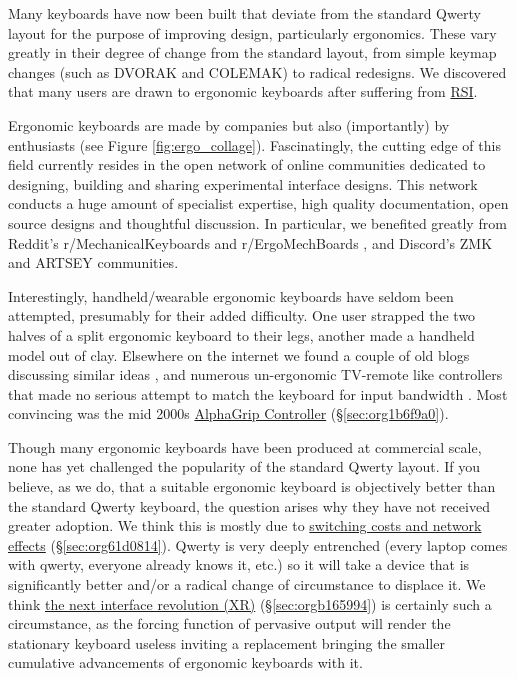 \documentclass[logo,bsc,singlespacing,parskip]{infthesis}
\begin{document}
Many keyboards have now been built that deviate from the standard Qwerty layout for the purpose of improving design, particularly ergonomics.
These vary greatly in their degree of change from the standard layout, from simple keymap changes (such as DVORAK and COLEMAK) to radical redesigns.
We discovered that many users are drawn to ergonomic keyboards after suffering from \hyperref[org77f0234]{RSI}.

Ergonomic keyboards are made by companies but also (importantly) by enthusiasts (see Figure \ref{fig:ergo_collage}).
Fascinatingly, the cutting edge of this field currently resides in the open network of online communities dedicated to designing, building and sharing  experimental interface designs.
This network conducts a huge amount of specialist expertise, high quality documentation, open source designs and thoughtful discussion.
In particular, we benefited greatly from Reddit's r/MechanicalKeyboards \autocite{MechanicalKeyboardsAllClick} and  r/ErgoMechBoards \autocite{ErgoMechBoards}, and Discord's ZMK and ARTSEY communities.

Interestingly, handheld/wearable ergonomic keyboards have seldom been attempted, presumably for their added difficulty.
One user strapped the two halves of a split ergonomic keyboard to their legs, another made a handheld model out of clay.
Elsewhere on the internet we found a couple of old blogs discussing similar ideas \autocite{ChorditeAnotherOnehand}, and numerous un-ergonomic TV-remote like controllers that made no serious attempt to match the keyboard for input bandwidth \autocite{TwiddlerTekGear}.
Most convincing was the mid 2000s \hyperref[sec:org1b6f9a0]{AlphaGrip Controller} (\S \ref{sec:org1b6f9a0}).

Though many ergonomic keyboards have been produced at commercial scale, none has yet challenged the popularity of the standard Qwerty layout.
If you believe, as we do, that a suitable ergonomic keyboard is objectively better than the standard Qwerty keyboard, the question arises why they have not received greater adoption.
We think this is mostly due to \hyperref[sec:org61d0814]{switching costs and network effects} (\S \ref{sec:org61d0814}).
Qwerty is very deeply entrenched (every laptop comes with qwerty, everyone already knows it, etc.) so it will take a device that is significantly better and/or a radical change of circumstance to displace it.
We think \hyperref[sec:orgb165994]{the next interface revolution (XR)} (\S \ref{sec:orgb165994}) is certainly such a circumstance, as the forcing function of pervasive output will render the stationary keyboard useless inviting a replacement bringing the smaller cumulative advancements of ergonomic keyboards with it.
\end{document}
